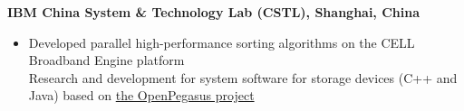 \textbf{IBM China System \& Technology Lab (CSTL), Shanghai, China}\\
\vspace{-2mm}
\begin{itemize}
\item 
{}
Developed parallel high-performance sorting algorithms on the CELL Broadband Engine platform \\
Research and development for system software for storage devices (C++ and Java) based on 
\hyperref{http://www.opengroup.org/subjectareas/management/openpegasus}{}{}{the OpenPegasus project}
\end{itemize}


